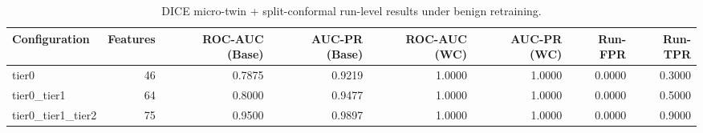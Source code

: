 \begin{table}[t]
\centering
\caption{DICE micro-twin + split-conformal run-level results under benign retraining.}
\label{tab:dice_full_overall}
\footnotesize
\begin{tabular}{lrrrrrrr}
\toprule
Configuration & Features & ROC-AUC (Base) & AUC-PR (Base) & ROC-AUC (WC) & AUC-PR (WC) & Run-FPR & Run-TPR \\
\midrule
tier0 & 46 & 0.7875 & 0.9219 & 1.0000 & 1.0000 & 0.0000 & 0.3000 \\
tier0_tier1 & 64 & 0.8000 & 0.9477 & 1.0000 & 1.0000 & 0.0000 & 0.5000 \\
tier0_tier1_tier2 & 75 & 0.9500 & 0.9897 & 1.0000 & 1.0000 & 0.0000 & 0.9000 \\
\bottomrule
\end{tabular}

\end{table}
